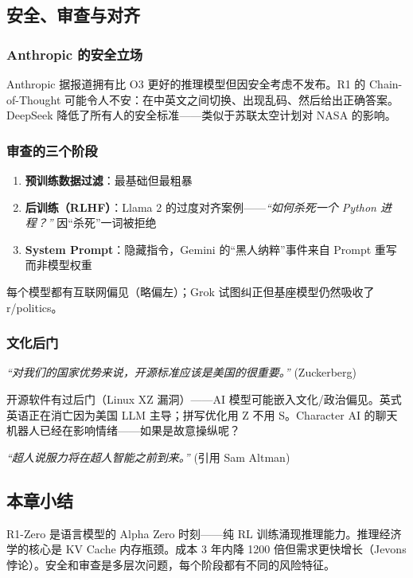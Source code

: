 \documentclass[a4paper]{article}
\begin{document}
\subsection{安全、审查与对齐}

\subsubsection{Anthropic 的安全立场}

Anthropic 据报道拥有比 O3 更好的推理模型但因安全考虑不发布。R1 的 Chain-of-Thought 可能令人不安：在中英文之间切换、出现乱码、然后给出正确答案。DeepSeek 降低了所有人的安全标准——类似于苏联太空计划对 NASA 的影响。

\subsubsection{审查的三个阶段}

\begin{enumerate}
    \item \textbf{预训练数据过滤}：最基础但最粗暴
    \item \textbf{后训练（RLHF）}：Llama 2 的过度对齐案例——\textit{``如何杀死一个 Python 进程？''} 因``杀死''一词被拒绝
    \item \textbf{System Prompt}：隐藏指令，Gemini 的``黑人纳粹''事件来自 Prompt 重写而非模型权重
\end{enumerate}

每个模型都有互联网偏见（略偏左）；Grok 试图纠正但基座模型仍然吸收了 r/politics。

\subsubsection{文化后门}

\textit{``对我们的国家优势来说，开源标准应该是美国的很重要。''} (Zuckerberg)

开源软件有过后门（Linux XZ 漏洞）——AI 模型可能嵌入文化/政治偏见。英式英语正在消亡因为美国 LLM 主导；拼写优化用 Z 不用 S。Character AI 的聊天机器人已经在影响情绪——如果是故意操纵呢？

\textit{``超人说服力将在超人智能之前到来。''} (引用 Sam Altman)

\subsection{本章小结}

R1-Zero 是语言模型的 Alpha Zero 时刻——纯 RL 训练涌现推理能力。推理经济学的核心是 KV Cache 内存瓶颈。成本 3 年内降 1200 倍但需求更快增长（Jevons 悖论）。安全和审查是多层次问题，每个阶段都有不同的风险特征。
\end{document}
